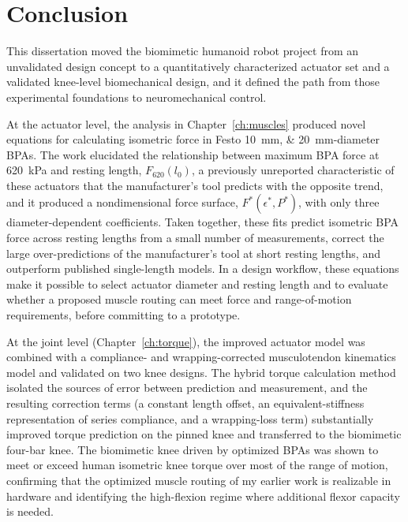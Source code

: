 \chapter{Conclusion}\label{ch:conclusion}
\graphicspath{{../Figures/80-conclusion/}{figs/80-conclusion/}}

This dissertation moved the biomimetic humanoid robot project from an unvalidated design concept to a quantitatively characterized actuator set and a validated knee-level biomechanical design, and it defined the path from those experimental foundations to neuromechanical control.

At the actuator level, the analysis in Chapter~\ref{ch:muscles} produced novel equations for calculating isometric force in Festo \qtylist{10;20}{\mm}-diameter BPAs. The work elucidated the relationship between maximum BPA force at \qty{620}{\kPa} and resting length, $F_{620}(l_0)$, a previously unreported characteristic of these actuators that the manufacturer's tool predicts with the opposite trend, and it produced a nondimensional force surface, $F^*(\epsilon^*,P^*)$, with only three diameter-dependent coefficients. Taken together, these fits predict isometric BPA force across resting lengths from a small number of measurements, correct the large over-predictions of the manufacturer's tool at short resting lengths, and outperform published single-length models. In a design workflow, these equations make it possible to select actuator diameter and resting length and to evaluate whether a proposed muscle routing can meet force and range-of-motion requirements, before committing to a prototype.

At the joint level (Chapter~\ref{ch:torque}), the improved actuator model was combined with a compliance- and wrapping-corrected musculotendon kinematics model and validated on two knee designs. The hybrid torque calculation method isolated the sources of error between prediction and measurement, and the resulting correction terms (a constant length offset, an equivalent-stiffness representation of series compliance, and a wrapping-loss term) substantially improved torque prediction on the pinned knee and transferred to the biomimetic four-bar knee. The biomimetic knee driven by optimized BPAs was shown to meet or exceed human isometric knee torque over most of the range of motion, confirming that the optimized muscle routing of my earlier work is realizable in hardware and identifying the high-flexion regime where additional flexor capacity is needed.

